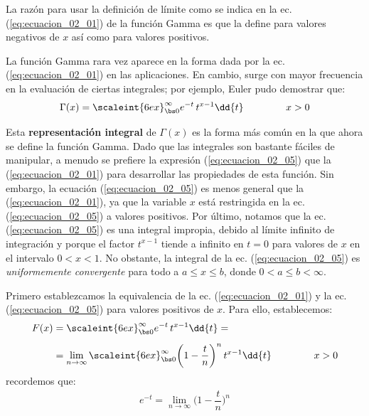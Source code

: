 La razón para usar la definición de límite como se indica en la ec. (\ref{eq:ecuacion_02_01}) de la función Gamma es que la define para valores negativos de $x$ así como para valores positivos.
\par
La función Gamma rara vez aparece en la forma dada por la ec. (\ref{eq:ecuacion_02_01}) en las aplicaciones. En cambio, surge con mayor frecuencia en la evaluación de ciertas integrales; por ejemplo, Euler pudo demostrar que:
\begin{align}
\Gamma (x) = \scaleint{6ex}_{\bs 0}^{\infty} e^{-t} \, t^{x- 1} \dd{t} \hspace{1.5cm} x > 0
\label{eq:ecuacion_02_05}
\end{align}

Esta \textbf{representación integral} de $\Gamma (x)$ es la forma más común en la que ahora se define la función Gamma. Dado que las integrales son bastante fáciles de manipular, a menudo se prefiere la expresión (\ref{eq:ecuacion_02_05}) que la (\ref{eq:ecuacion_02_01}) para desarrollar las propiedades de esta función. Sin embargo, la ecuación (\ref{eq:ecuacion_02_05}) es menos general que la (\ref{eq:ecuacion_02_01}), ya que la variable $x$ está restringida en la ec. (\ref{eq:ecuacion_02_05}) a valores positivos. Por último, notamos que la ec. (\ref{eq:ecuacion_02_05}) es una integral impropia, debido al límite infinito de integración y porque el factor $t^{x-1}$ tiende a infinito en $t = 0$ para valores de $x$ en el intervalo $0 < x < 1$. No obstante, la integral de la ec. (\ref{eq:ecuacion_02_05}) es \emph{uniformemente convergente} para todo a $a \leq x \leq b$, donde $0 < a \leq b < \infty$.
\par
Primero establezcamos la equivalencia de la ec. (\ref{eq:ecuacion_02_01}) y la ec. (\ref{eq:ecuacion_02_05}) para valores positivos de $x$. Para ello, establecemos:
\begin{align}
\begin{aligned}
F(x) &= \scaleint{6ex}_{\bs 0}^{\infty} e^{-t} \, t^{x- 1} \dd{t} = \\[0.5em]
&= \lim_{n \to \infty} \scaleint{6ex}_{\bs 0}^{\infty} \bigg( 1 - \dfrac{t}{n} \bigg)^{n} \, t^{x- 1} \dd{t} \hspace{1.5cm} x > 0
\end{aligned}
\label{eq:ecuacion_02_06}
\end{align}
recordemos que:
\begin{align}
e^{-t} = \lim_{n \to \infty} \bigg( 1 - \dfrac{t}{n} \bigg)^{n}
\label{eq:ecuacion_02_07}
\end{align}

